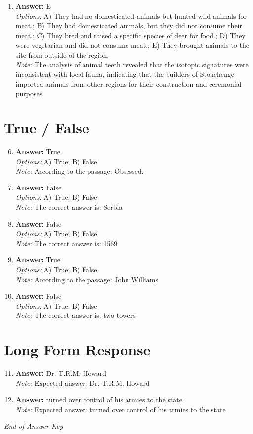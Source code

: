 \documentclass[12pt]{article}
\begin{document}
\begin{enumerate}[label=\arabic*.]
\item \textbf{Answer:} E
\\ \textit{Options:} A) They had no domesticated animals but hunted wild animals for meat.; B) They had domesticated animals, but they did not consume their meat.; C) They bred and raised a specific species of deer for food.; D) They were vegetarian and did not consume meat.; E) They brought animals to the site from outside of the region.
\\ \textit{Note:} The analysis of animal teeth revealed that the isotopic signatures were inconsistent with local fauna, indicating that the builders of Stonehenge imported animals from other regions for their construction and ceremonial purposes.
\end{enumerate}

\section*{True / False}
\begin{enumerate}[label=\arabic*.]
\setcounter{enumi}{5}
\item \textbf{Answer:} True
\\ \textit{Options:} A) True; B) False
\\ \textit{Note:} According to the passage: Obsessed.
\item \textbf{Answer:} False
\\ \textit{Options:} A) True; B) False
\\ \textit{Note:} The correct answer is: Serbia
\item \textbf{Answer:} False
\\ \textit{Options:} A) True; B) False
\\ \textit{Note:} The correct answer is: 1569
\item \textbf{Answer:} True
\\ \textit{Options:} A) True; B) False
\\ \textit{Note:} According to the passage: John Williams
\item \textbf{Answer:} False
\\ \textit{Options:} A) True; B) False
\\ \textit{Note:} The correct answer is: two towers
\end{enumerate}

\section*{Long Form Response}
\begin{enumerate}[label=\arabic*.]
\setcounter{enumi}{10}
\item \textbf{Answer:} Dr. T.R.M. Howard
\\ \textit{Note:} Expected answer: Dr. T.R.M. Howard
\item \textbf{Answer:} turned over control of his armies to the state
\\ \textit{Note:} Expected answer: turned over control of his armies to the state
\end{enumerate}

\vfill
\noindent\textit{End of Answer Key}
\end{document}
